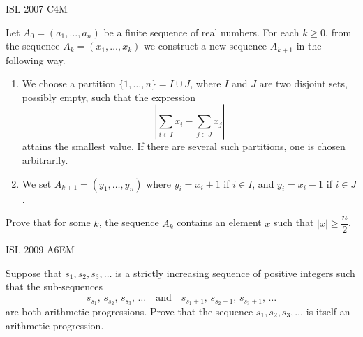 

{ISL 2007 C4}{M}{
    Let $ A_0 = (a_1,\dots,a_n)$ be a finite sequence of real numbers. For
    each $ k\geq 0$, from the sequence $ A_k = (x_1,\dots,x_k)$ we construct a
    new sequence $ A_{k + 1}$ in the following way.
    \begin{enumerate}
        \item We choose a partition $ \{1,\dots,n\} = I\cup J$, where $ I$ and
            $ J$ are two disjoint sets, possibly empty, such that the expression 
            \[\left|\sum_{i\in I}x_i - \sum_{j\in J}x_j\right|\] 
            attains the smallest value. If there are several such partitions,
            one is chosen arbitrarily.
        \item We set $ A_{k + 1} = (y_1,\dots,y_n)$ where $ y_i = x_i + 1$ if
            $ i\in I$, and $ y_i = x_i - 1$ if $ i\in J$.
    \end{enumerate}
    Prove that for some $ k$, the sequence $ A_k$ contains an element $ x$
    such that $ |x|\geq\dfrac n2$.

}\label{problem:invariant_rules_of_thumb_11}




{ISL 2009 A6}{EM}{
    Suppose that $ s_1,s_2,s_3, \ldots$ is a strictly increasing sequence of
    positive integers such that the sub-sequences 
    \[s_{s_1},\, s_{s_2},\, s_{s_3},\, \ldots\quad\text{and}\quad
    s_{s_1+1},\, s_{s_2+1},\, s_{s_3+1},\, \ldots\] 
    are both arithmetic progressions. Prove that the sequence $ s_1, s_2, s_3,
    \ldots$ is itself an arithmetic progression.

}

